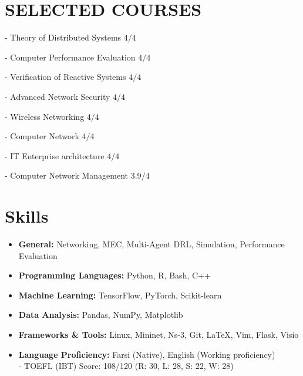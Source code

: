 \documentclass[11pt]{article}
\begin{document}
\newpage

\section{SELECTED COURSES}
		\vspace{-5mm}
	     \setlength\itemsep{0em}
	     \begin{multicols}{2}
				- Theory of Distributed Systems  \hfill $4/4$ 
				
			    -  Computer Performance Evaluation \hfill $4/4$
			    
			    - Verification of Reactive Systems  \hfill  $4/4$
			     
				 - Advanced Network Security  \hfill $4/4$
				 
		         - Wireless Networking  \hfill $4/4$
		         
		         - Computer Network  \hfill $4/4$
		         
		          - IT Enterprise architecture  \hfill  $4/4$
		         
		         - Computer Network Management  \hfill $3.9/4$
		         

		         
		     \end{multicols}


\section{Skills}



\begin{itemize}[noitemsep,topsep=0pt,parsep=0pt,partopsep=0pt]
	\item {\textbf{General:} Networking, MEC, Multi-Agent DRL, Simulation, Performance Evaluation}\vspace{1mm}
	\item {\textbf{Programming Languages:} Python, R, Bash, C++}\vspace{1mm}
	\item {\textbf{Machine Learning:} TensorFlow, PyTorch, Scikit-learn}\vspace{1mm}
	\item {\textbf{Data Analysis:} Pandas, NumPy, Matplotlib}\vspace{1mm}
	\item {\textbf{Frameworks \& Tools:} Linux, Mininet, Ns-3, Git, \LaTeX, Vim, Flask, Visio}\vspace{1mm}
	\item {\textbf{Language Proficiency:} Farsi (Native), English (Working proficiency)}\vspace{1mm}\\
	- TOEFL (IBT) Score: 108/120 (R: 30, L: 28, S: 22, W: 28)


\end{itemize}
\end{document}
